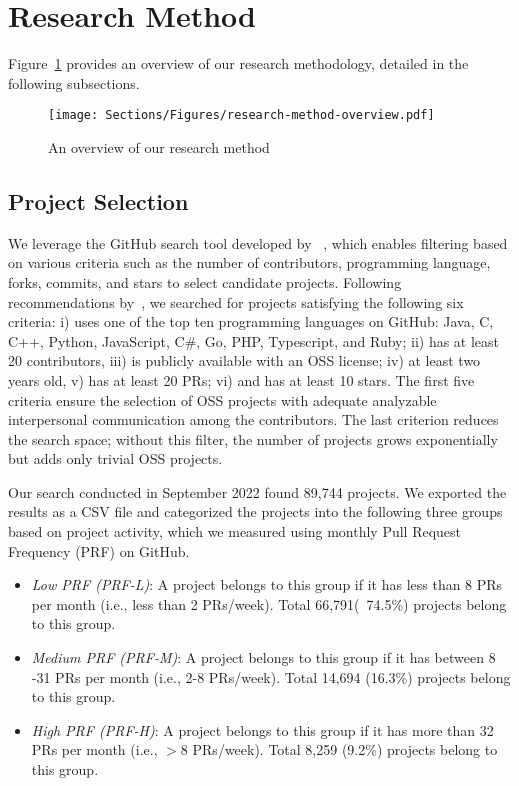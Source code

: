 
\section{Research Method}
\label{sec:research-method}
Figure~\ref{fig:method_overview} provides an overview of our research methodology, detailed in the following subsections.
\begin{figure}[t!]
	\centering  
\texttt{[image: Sections/Figures/research-method-overview.pdf]}
	\caption{An overview of our research method}
	\label{fig:method_overview}	
\end{figure}

\subsection{Project Selection}
We leverage the GitHub search tool developed by ~\citet{Dabic:msr2021data}, which enables filtering based on various criteria such as the number of contributors, programming language, forks, commits, and stars to select candidate projects. Following recommendations by~\citet{kalliamvakou2016depth}, we searched for projects satisfying the following six criteria: i) uses one of the top ten programming languages on GitHub:  Java, C, C++, Python, JavaScript, C{\#}, Go, PHP, Typescript, and Ruby; ii) has at least 20 contributors, iii) is publicly available with an OSS license; iv) at least two years old, v) has at least 20 PRs; vi) and has at least 10 stars. 
The first five criteria ensure the selection of OSS projects with adequate analyzable interpersonal communication among the contributors. 
The last criterion reduces the search space; without this filter, the number of projects grows exponentially but adds only trivial OSS projects.


 


Our search conducted in September 2022 found 89,744 projects. We exported the results as a CSV file and categorized the projects into the following three groups based on project activity, which we measured using monthly Pull Request Frequency (PRF) on GitHub. 
\begin{itemize}
    \item \emph{Low PRF (PRF-L)}: A project belongs to this group if it has less than 8 PRs per month (i.e., less than 2 PRs/week). Total 66,791(~74.5\%) projects belong to this group. 
    \item  \emph{Medium PRF (PRF-M)}: A project belongs to this group if it has between 8 -31 PRs per month (i.e., 2-8 PRs/week). Total 14,694  (16.3\%) projects belong to this group. 
    \item \emph{High PRF (PRF-H)}:  A project belongs to this group if it has more than 32 PRs per month (i.e., $>$8 PRs/week). Total 8,259  (9.2\%) projects belong to this group.
\end{itemize}

